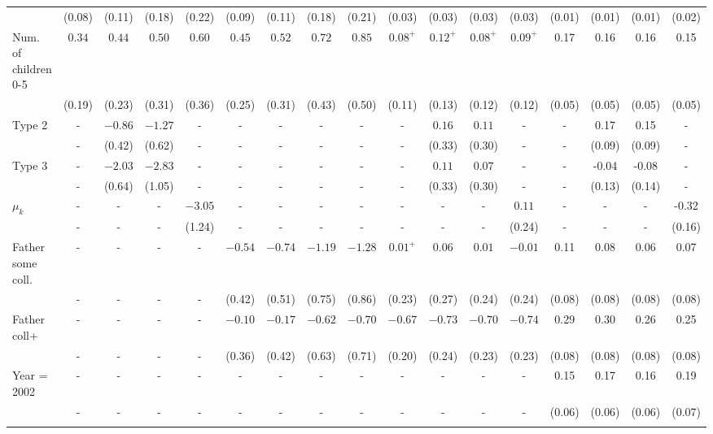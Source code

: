\begin{tabular}{lcccccccccccccccc}
&(0.08)&(0.11)&(0.18)&(0.22)&(0.09)&(0.11)&(0.18)&(0.21)&(0.03)&(0.03)&(0.03)&(0.03)&(0.01)&(0.01)&(0.01)&(0.02)\\
Num. of children 0-5&$0.34$&$0.44$&$0.50$&$0.60$&$0.45$&$0.52$&$0.72$&$0.85$&$0.08^{+}$&$0.12^{+}$&$0.08^{+}$&$0.09^{+}$&0.17&0.16&0.16&0.15\\
&(0.19)&(0.23)&(0.31)&(0.36)&(0.25)&(0.31)&(0.43)&(0.50)&(0.11)&(0.13)&(0.12)&(0.12)&(0.05)&(0.05)&(0.05)&(0.05)\\
Type 2&-&$-0.86$&$-1.27$&-&-&-&-&-&-&$0.16$&$0.11$&-&-&0.17&0.15&-\\
&-&(0.42)&(0.62)&-&-&-&-&-&-&(0.33)&(0.30)&-&-&(0.09)&(0.09)&-\\
Type 3&-&$-2.03$&$-2.83$&-&-&-&-&-&-&$0.11$&$0.07$&-&-&-0.04&-0.08&-\\
&-&(0.64)&(1.05)&-&-&-&-&-&-&(0.33)&(0.30)&-&-&(0.13)&(0.14)&-\\
$\mu_{k}$&-&-&-&$-3.05$&-&-&-&-&-&-&-&$0.11$&-&-&-&-0.32\\
&-&-&-&(1.24)&-&-&-&-&-&-&-&(0.24)&-&-&-&(0.16)\\
Father some coll.&-&-&-&-&$-0.54$&$-0.74$&$-1.19$&$-1.28$&$0.01^{+}$&$0.06$&$0.01$&$-0.01$&0.11&0.08&0.06&0.07\\
&-&-&-&-&(0.42)&(0.51)&(0.75)&(0.86)&(0.23)&(0.27)&(0.24)&(0.24)&(0.08)&(0.08)&(0.08)&(0.08)\\
Father coll+&-&-&-&-&$-0.10$&$-0.17$&$-0.62$&$-0.70$&$-0.67$&$-0.73$&$-0.70$&$-0.74$&0.29&0.30&0.26&0.25\\
&-&-&-&-&(0.36)&(0.42)&(0.63)&(0.71)&(0.20)&(0.24)&(0.23)&(0.23)&(0.08)&(0.08)&(0.08)&(0.08)\\
Year = 2002&-&-&-&-&-&-&-&-&-&-&-&-&0.15&0.17&0.16&0.19\\
&-&-&-&-&-&-&-&-&-&-&-&-&(0.06)&(0.06)&(0.06)&(0.07)\\
\\
\bottomrule\end{tabular}